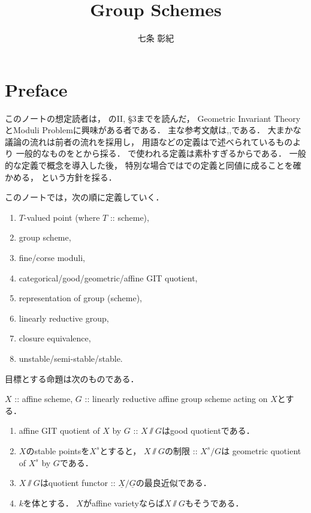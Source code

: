 \documentclass[a4paper]{jsarticle}
\newcommand{\func}[1]{\underline{#1}}
\begin{document}
\title{Group Schemes}
\author{七条 彰紀}
\maketitle
\tableofcontents

\section{Preface}
    このノートの想定読者は，
    \cite{HarAG}のII, \S 3までを読んだ，
    Geometric Invariant TheoryとModuli Problemに興味がある者である．
    主な参考文献は\cite{Muk1},\cite{AV},\cite{Hos}である．
    大まかな議論の流れは前者の流れを採用し，
    用語などの定義は\cite{Muk1}で述べられているものより
    一般的なものを\cite{AV}と\cite{Hos}から採る．
    \cite{Muk1}で使われる定義は素朴すぎるからである．
    一般的な定義で概念を導入した後，
    特別な場合では\cite{Muk1}での定義と同値に成ることを確かめる，
    という方針を採る．

    このノートでは，次の順に定義していく．
    \begin{enumerate}
        \item $T$-valued point (where $T$ :: scheme),
        \item group scheme,
        \item fine/corse moduli,
        \item categorical/good/geometric/affine GIT quotient,
        \item representation of group (scheme),
        \item linearly reductive group,
        \item closure equivalence,
        \item unstable/semi-stable/stable.
    \end{enumerate}

    目標とする命題は次のものである．
    \begin{Thm}
        $X$ :: affine scheme,
        $G$ :: linearly reductive affine group scheme acting on $X$とする．
        \begin{enumerate}[label=(\roman*), leftmargin=*]
        \item 
        affine GIT quotient of $X$ by $G$ :: $X \sslash G$はgood quotientである．

        \item
        $X$のstable pointsを$X^s$とすると，
        $X \sslash G$の制限 :: $X^s \slash G$は
        geometric quotient of $X^s$ by $G$である．

        \item
        $X \sslash G$はquotient functor :: $\func{X} \slash \func{G}$の最良近似である．

        \item
        $k$を体とする．
        $X$がaffine varietyならば$X \sslash G$もそうである．
        \end{enumerate}
    \end{Thm}
\end{document}

